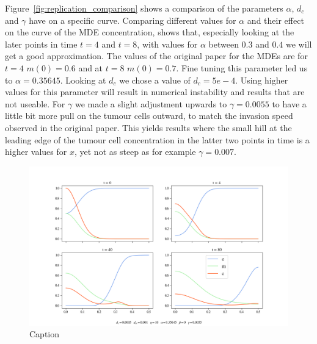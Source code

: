 Figure~\ref{fig:replication_comparison} shows a comparison of the parameters $\alpha$, $d_c$ and $\gamma$ have on a specific curve. Comparing different values for $\alpha$ and their effect on the curve of the MDE concentration, shows that, especially looking at the later points in time $t=4$ and $t=8$, with values for $\alpha$ between $0.3$ and $0.4$ we will get a good approximation. The values of the original paper for the MDEs are for $t=4$ $m(0)=0.6$ and at $t=8$ $m(0)=0.7$. Fine tuning this parameter led us to $\alpha=0.35645$.\newline 
Looking at $d_c$ we chose a value of $d_c=5e-4$. Using higher values for this parameter will result in numerical instability and results that are not useable. For $\gamma$ we made a slight adjustment upwards to $\gamma=0.0055$ to have a little bit more pull on the tumour cells outward, to match the invasion speed observed in the original paper. This yields results where the small hill at the leading edge of the tumour cell concentration in the latter two points in time is a higher values for $x$, yet not as steep as for example $\gamma = 0.007$. \newline

\begin{figure}[h]
    \centering
    \includegraphics[width=\textwidth]{resources/images/2D_5e-4_1e-3_1e-3_10_0.35645_0_0.0055_1e-2_10_plot.png}
    \caption{Caption}
    \label{fig:2D_5e-4_1e-3_1e-3_10_0.35645_0_0.0055}
\end{figure}

